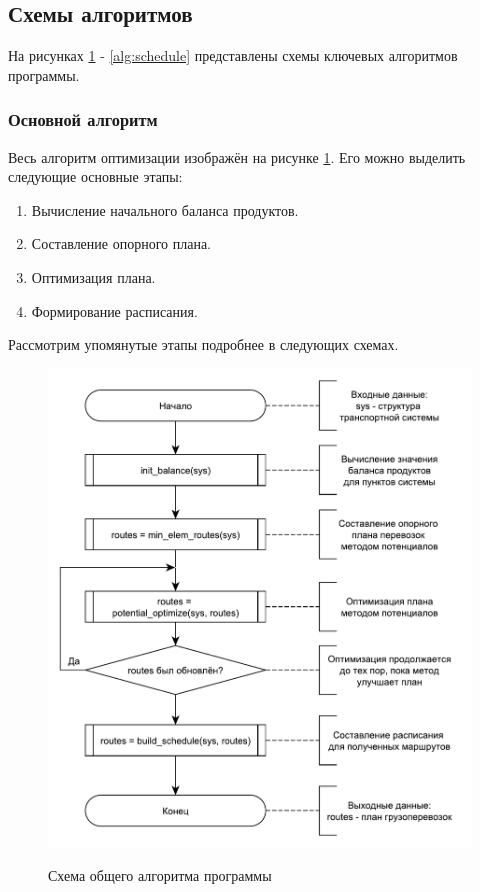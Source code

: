 \subsection{Схемы алгоритмов}
На рисунках \ref{alg:main} - \ref{alg:schedule} представлены схемы ключевых алгоритмов программы.

\subsubsection{Основной алгоритм}
Весь алгоритм оптимизации изображён на рисунке \ref{alg:main}. Его можно выделить следующие основные этапы:
\begin{enumerate}
	\item Вычисление начального баланса продуктов.
	\item Составление опорного плана.
	\item Оптимизация плана.
	\item Формирование расписания.
\end{enumerate}

Рассмотрим упомянутые этапы подробнее в следующих схемах.

\pagebreak
\begin{figure}[h]
	\begin{center}
		{\includegraphics[scale=0.7, angle=0, page=1]{img/main_algorithm.pdf}}
		\caption{Схема общего алгоритма программы}
		\label{alg:main}
	\end{center}
\end{figure}

